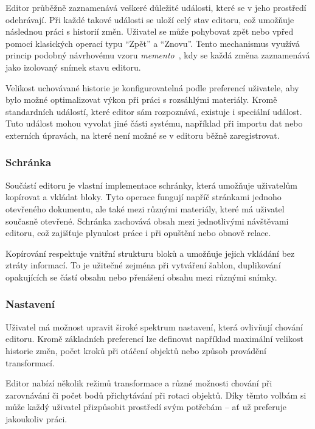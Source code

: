 Editor průběžně zaznamenává veškeré důležité události, které se v jeho prostředí odehrávají. 
Při každé takové události se uloží celý stav editoru, což umožňuje následnou práci s historií změn. 
Uživatel se může pohybovat zpět nebo vpřed pomocí klasických operací typu \enquote{Zpět} a \enquote{Znovu}. Tento mechanismus využívá princip podobný návrhovému vzoru \emph{memento}~, kdy se každá změna zaznamenává jako izolovaný snímek stavu editoru.

Velikost uchovávané historie je konfigurovatelná podle preferencí uživatele, aby bylo možné optimalizovat výkon při práci s rozsáhlými materiály. 
Kromě standardních událostí, které editor sám rozpoznává, existuje i speciální událost.
Tuto událost mohou vyvolat jiné části systému, například při importu dat nebo externích úpravách, na které není možné se v editoru běžně zaregistrovat.

\subsubsection{Schránka}

Součástí editoru je vlastní implementace schránky, která umožňuje uživatelům kopírovat a vkládat bloky. 
Tyto operace fungují napříč stránkami jednoho otevřeného dokumentu, ale také mezi různými materiály, které má uživatel současně otevřené. 
Schránka zachovává obsah mezi jednotlivými návštěvami editoru, což zajišťuje plynulost práce i při opuštění nebo obnově relace.

Kopírování respektuje vnitřní strukturu bloků a umožňuje jejich vkládání bez ztráty informací. 
To je užitečné zejména při vytváření šablon, duplikování opakujících se částí obsahu nebo přenášení obsahu mezi různými snímky.

\subsubsection{Nastavení}

Uživatel má možnost upravit široké spektrum nastavení, která ovlivňují chování editoru. 
Kromě základních preferencí lze definovat například maximální velikost historie změn, počet kroků při otáčení objektů nebo způsob provádění transformací.

Editor nabízí několik režimů transformace a různé možnosti chování při zarovnávání či počet bodů přichytávání při rotaci objektů. 
Díky těmto volbám si může každý uživatel přizpůsobit prostředí svým potřebám -- ať už preferuje jakoukoliv práci.

